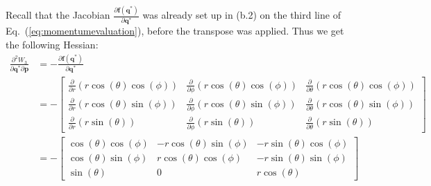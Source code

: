 \documentclass[titlepage]{article}
\begin{document}
Recall that the Jacobian $\frac{\partial\boldsymbol{f}(\boldsymbol{q}^*)}{\partial\boldsymbol{q}^*}$ was already set up in (b.2) on the third line of Eq.~(\ref{eq:momentumevaluation}), before the transpose was applied. Thus we get the following Hessian:
\begin{equation}
	\begin{split}
		\frac{\partial^2W_3}{\partial\boldsymbol{q}^*\partial\boldsymbol{p}}&=-\frac{\partial\boldsymbol{f}(\boldsymbol{q}^*)}{\partial\boldsymbol{q}^*} \\
		&=-
		\begin{bmatrix}
			\frac{\partial}{\partial r}\left(r\cos(\theta)\cos(\phi)\right) & \frac{\partial}{\partial\phi}\left(r\cos(\theta)\cos(\phi)\right) & \frac{\partial}{\partial\theta}\left(r\cos(\theta)\cos(\phi)\right) \\
			\frac{\partial}{\partial r}\left(r\cos(\theta)\sin(\phi)\right) & \frac{\partial}{\partial\phi}\left(r\cos(\theta)\sin(\phi)\right) & \frac{\partial}{\partial\theta}\left(r\cos(\theta)\sin(\phi)\right) \\
			\frac{\partial}{\partial r}\left(r\sin(\theta)\right) & \frac{\partial}{\partial\phi}\left(r\sin(\theta)\right) & \frac{\partial}{\partial\theta}\left(r\sin(\theta)\right)
		\end{bmatrix} \\
		&=-
		\begin{bmatrix}
			\cos(\theta)\cos(\phi) & -r\cos(\theta)\sin(\phi) & -r\sin(\theta)\cos(\phi) \\
			\cos(\theta)\sin(\phi) & r\cos(\theta)\cos(\phi) & -r\sin(\theta)\sin(\phi) \\
			\sin(\theta) & 0 & r\cos(\theta)
		\end{bmatrix}
	\end{split}
\end{equation}

\newpage
\end{document}
